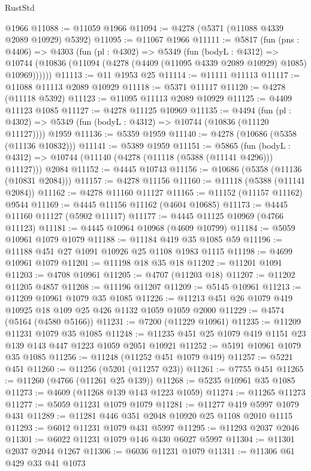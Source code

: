 \begin{lexlean}{RustStd}
\begin{coremodule}
{\begin{coremodule}
{{{{{{{{{{{{{{{{{{{{{{{{{{{{{{{{{{{    @1966
@11088 := @11059 @1966
@11094 := @4278 (@5371 (@11088 @4339 @2089 @10929) @5392)
@11095 := @11067 @1966
@11111 := @5817
    (fun (pns : @4406) =>
    @4303
      (fun (pl : @4302) =>
      @5349
        (fun (bodyL : @4312) =>
        @10744 (@10836 (@11094 (@4278 (@4409 (@11095 @4339 @2089 @10929) @1085) @10969))))))
@11113 := @11 @1953 @25
@11114 := @11111 @11113
@11117 := @11088 @11113 @2089 @10929
@11118 := @5371 @11117
@11120 := @4278 (@11118 @5392)
@11123 := @11095 @11113 @2089 @10929
@11125 := @4409 @11123 @1085
@11127 := @4278 @11125 @10969
@11135 := @4494
    (fun (pl : @4302) => @5349 (fun (bodyL : @4312) => @10744 (@10836 (@11120 @11127))))
    @1959
@11136 := @5359 @1959
@11140 := @4278 (@10686 (@5358 (@11136 @10832)))
@11141 := @5389 @1959
@11151 := @5865
    (fun (bodyL : @4312) => @10744 (@11140 (@4278 (@11118 (@5388 (@11141 @4296))) @11127)))
    @2084
@11152 := @4445 @10743
@11156 := @10686 (@5358 (@11136 (@10831 @2084)))
@11157 := @4278 @11156
@11160 := @11118 (@5388 (@11141 @2084))
@11162 := @4278 @11160 @11127
@11165 := @11152 (@11157 @11162) @9544
@11169 := @4445 @11156 @11162 (@4604 @10685)
@11173 := @4445 @11160 @11127 (@5902 @11117)
@11177 := @4445 @11125 @10969 (@4766 @11123)
@11181 := @4445 @10964 @10968 (@4609 @10799)
@11184 := @5059 @10961 @1079 @1079
@11188 := @11184 @419 @35 @1085 @59
@11196 := @11188 @451 @27 @1091 @10926 @25 @1108 @1983 @1115
@11198 := @4699 @10961 @1079
@11201 := @11198 @18 @35 @18
@11202 := @11201 @1091
@11203 := @4708 @10961
@11205 := @4707 (@11203 @18)
@11207 := @11202 @11205 @4857
@11208 := @11196 @11207
@11209 := @5145 @10961
@11213 := @11209 @10961 @1079 @35 @1085
@11226 := @11213 @451 @26 @1079 @419 @10925 @18 @109 @25 @426 @1132 @1059 @1059 @2000
@11229 := @4574 (@5164 (@4580 @5166))
@11231 := @7200 (@11229 @10961)
@11235 := @11209 @11231 @1079 @35 @1085
@11248 := @11235 @451 @25 @1079 @419 @1151 @23 @139 @143 @447 @1223 @1059 @2051 @10921
@11252 := @5191 @10961 @1079 @35 @1085
@11256 := @11248 (@11252 @451 @1079 @419)
@11257 := @5221 @451
@11260 := @11256 (@5201 (@11257 @23))
@11261 := @7755 @451
@11265 := @11260 (@4766 (@11261 @25 @139))
@11268 := @5235 @10961 @35 @1085
@11273 := @4609 (@11268 @139 @143 @1223 @1059)
@11274 := @11265 @11273
@11277 := @5059 @11231 @1079 @1079
@11281 := @11277 @419 @5997 @1079 @431
@11289 := @11281 @446 @351 @2048 @10920 @25 @1108 @2010 @1115
@11293 := @6012 @11231 @1079 @431 @5997
@11295 := @11293 @2037 @2046
@11301 := @6022 @11231 @1079 @146 @430 @6027 @5997
@11304 := @11301 @2037 @2044 @1267
@11306 := @6036 @11231 @1079
@11311 := @11306 @61 @429 @33 @41 @1073
}}}}}}}}}}}}}}}}}}}}}}}}}}}}}}}}}}}
\end{coremodule}}
\end{coremodule}
\end{lexlean}
